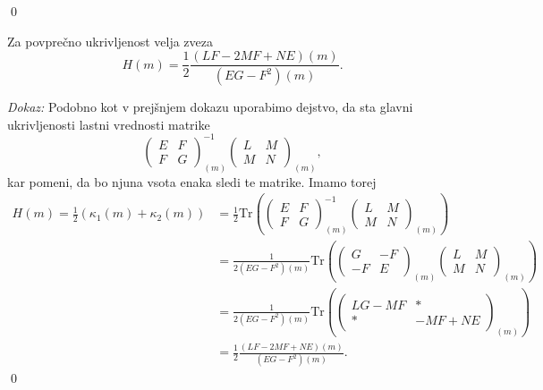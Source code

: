 \qed

\begin{izrek}
\label{izr_izrazava_povprecne_ukrivljenosti}
 Za povprečno ukrivljenost velja zveza \begin{equation*}
 H(m) = \frac{1}{2} \frac{(LF - 2MF + NE)(m)}{(EG - F^2)(m)}.
 \end{equation*}  
\end{izrek}
\noindent
{\em Dokaz:\/}
Podobno kot v prejšnjem dokazu uporabimo dejstvo, da sta glavni ukrivljenosti lastni vrednosti matrike \begin{equation*}
  \begin{pmatrix}
    E & F \\
    F & G
    \end{pmatrix}_{(m)}^{-1}\begin{pmatrix}
    L & M \\
    M & N
    \end{pmatrix}_{(m)},
  \end{equation*}  
kar pomeni, da bo njuna vsota enaka sledi te matrike. Imamo torej \begin{align*}
  H(m) = \frac{1}{2}(\kappa_1(m) + \kappa_2(m)) &= \frac{1}{2} \mathrm{Tr} \left( \begin{pmatrix}
    E & F \\
    F & G
    \end{pmatrix}_{(m)}^{-1}\begin{pmatrix}
    L & M \\
    M & N
    \end{pmatrix}_{(m)} \right)   \\
     &= \frac{1}{2(EG - F^2)(m)} \mathrm{Tr} \left(  \begin{pmatrix}
      G & -F \\
      -F & E
      \end{pmatrix}_{(m)} \begin{pmatrix}
      L & M \\
      M & N
      \end{pmatrix}_{(m)} \right) \\
      &=  \frac{1}{2(EG - F^2)(m)} \mathrm{Tr} \left( \begin{pmatrix}
        LG - MF & * \\
        * & -MF + NE
        \end{pmatrix}_{(m)} \right) \\
        &= \frac{1}{2} \frac{(LF - 2MF + NE)(m)}{(EG - F^2)(m)}.
\end{align*}
\qed


